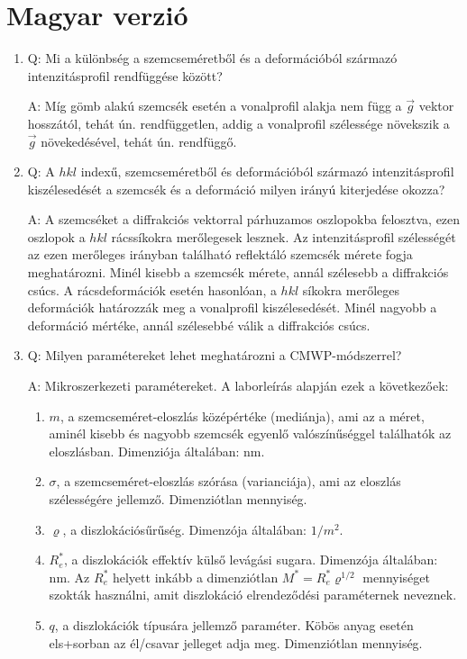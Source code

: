 \section{Magyar verzió}
\begin{enumerate}
	\item Q: Mi a különbség a szemcseméretből és a deformációból származó intenzitásprofil rendfüggése között?
    \begin{displayquote}
        A: Míg gömb alakú szemcsék esetén a  vonalprofil alakja nem függ a $\vec{g}$ vektor hosszától, tehát ún. rendfüggetlen, addig a  vonalprofil szélessége növekszik a $\vec{g}$ növekedésével, tehát ún. rendfüggő.
    \end{displayquote}
    \item Q: A $hkl$ indexű, szemcseméretből és deformációból származó intenzitásprofil kiszélesedését a szemcsék és a deformáció milyen irányú kiterjedése okozza?
    \begin{displayquote}
        A: A szemcséket a diffrakciós vektorral párhuzamos oszlopokba felosztva, ezen oszlopok a $hkl$ rácssíkokra merőlegesek lesznek. Az intenzitásprofil szélességét az ezen merőleges irányban található reflektáló szemcsék mérete fogja meghatározni. Minél kisebb a szemcsék mérete, annál szélesebb a diffrakciós csúcs. A rácsdeformációk esetén hasonlóan, a $hkl$ síkokra merőleges deformációk határozzák meg a vonalprofil kiszélesedését. Minél nagyobb a deformáció mértéke, annál szélesebbé válik a diffrakciós csúcs.
    \end{displayquote}
    \item Q: Milyen paramétereket lehet meghatározni a CMWP-módszerrel?
    \begin{displayquote}
        A: Mikroszerkezeti paramétereket. A laborleírás alapján ezek a következőek:
        \begin{enumerate}
        \item $m$, a szemcseméret-eloszlás középértéke (mediánja), ami az a méret, aminél kisebb és nagyobb szemcsék egyenlő valószínűséggel találhatók az eloszlásban. Dimenziója általában: nm.
		\item $\sigma$, a szemcseméret-eloszlás szórása (varianciája), ami az eloszlás szélességére jellemző. Dimenziótlan mennyiség.
		\item $\varrho$, a diszlokációsűrűség. Dimenzója általában: $1/m^{2}$.
		\item $R_{e}^{\ast}$, a diszlokációk effektív külső levágási sugara. Dimenzója általában: nm. Az $R_{e}^{\ast}$ helyett inkább a dimenziótlan $M^{\ast} = R_{e}^{\ast} \varrho^{1/2}$  mennyiséget szokták használni, amit diszlokáció elrendeződési paraméternek neveznek.
		\item $q$, a diszlokációk típusára jellemző paraméter. Köbös anyag esetén els+sorban az él/csavar jelleget adja meg. Dimenziótlan mennyiség. 
        \end{enumerate}
    \end{displayquote}
\end{enumerate}